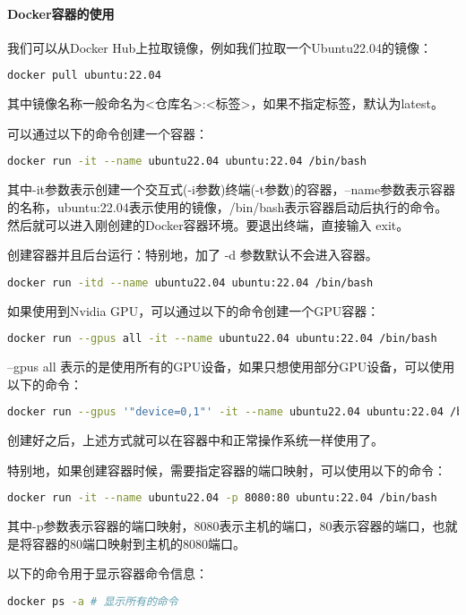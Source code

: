 \documentclass[lang=cn,a4paper,newtx]{elegantpaper}
\begin{document}
\paragraph{Docker容器的使用}
我们可以从Docker Hub上拉取镜像，例如我们拉取一个Ubuntu22.04的镜像：
\begin{lstlisting}[language=bash]
  docker pull ubuntu:22.04
\end{lstlisting}
其中镜像名称一般命名为<仓库名>:<标签>，如果不指定标签，默认为latest。

可以通过以下的命令创建一个容器：
\begin{lstlisting}[language=bash]
  docker run -it --name ubuntu22.04 ubuntu:22.04 /bin/bash
\end{lstlisting}
其中-it参数表示创建一个交互式(-i参数)终端(-t参数)的容器，--name参数表示容器的名称，ubuntu:22.04表示使用的镜像，/bin/bash表示容器启动后执行的命令。
然后就可以进入刚创建的Docker容器环境。要退出终端，直接输入 exit。

创建容器并且后台运行：特别地，加了 -d 参数默认不会进入容器。
\begin{lstlisting}[language=bash]
  docker run -itd --name ubuntu22.04 ubuntu:22.04 /bin/bash
\end{lstlisting}

如果使用到Nvidia GPU，可以通过以下的命令创建一个GPU容器：
\begin{lstlisting}[language=bash]
  docker run --gpus all -it --name ubuntu22.04 ubuntu:22.04 /bin/bash
\end{lstlisting}

--gpus all 表示的是使用所有的GPU设备，如果只想使用部分GPU设备，可以使用以下的命令：
\begin{lstlisting}[language=bash]
  docker run --gpus '"device=0,1"' -it --name ubuntu22.04 ubuntu:22.04 /bin/bash
\end{lstlisting}

创建好之后，上述方式就可以在容器中和正常操作系统一样使用了。

特别地，如果创建容器时候，需要指定容器的端口映射，可以使用以下的命令：
\begin{lstlisting}[language=bash]
  docker run -it --name ubuntu22.04 -p 8080:80 ubuntu:22.04 /bin/bash
\end{lstlisting}

其中-p参数表示容器的端口映射，8080表示主机的端口，80表示容器的端口，也就是将容器的80端口映射到主机的8080端口。

以下的命令用于显示容器命令信息：
\begin{lstlisting}[language=bash]
  docker ps -a # 显示所有的命令
\end{lstlisting}
\end{document}

